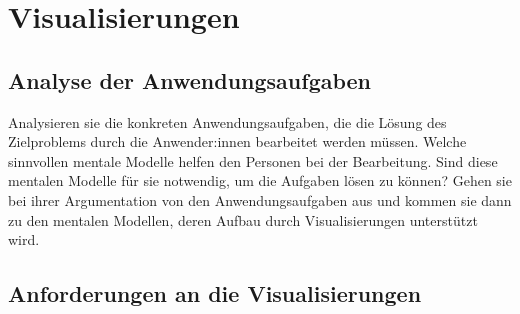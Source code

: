 
\section{Visualisierungen}

\subsection{Analyse der Anwendungsaufgaben}

Analysieren sie die konkreten Anwendungsaufgaben, die die Lösung des Zielproblems durch die Anwender:innen bearbeitet werden müssen. 
Welche sinnvollen mentale Modelle helfen den Personen bei der Bearbeitung. 
Sind diese mentalen Modelle für sie notwendig, um die Aufgaben lösen zu können? Gehen sie bei ihrer Argumentation von den Anwendungsaufgaben aus und kommen sie dann zu den mentalen Modellen, deren Aufbau durch Visualisierungen unterstützt wird. 
\subsection{Anforderungen an die Visualisierungen}


